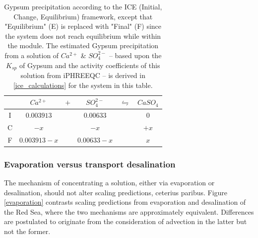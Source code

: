 \begin{supplementary}
\begin{table}[h]
    \centering
    \begin{tabular}{c|ccccc}
      \toprule
       & $Ca^{2+}$ & $+$ & $SO_4^{2-}$ & $\leftrightharpoons$ & $CaSO_4$ \\
      \midrule
      I & $0.003913$ && $0.00633$ && $0$ \\
      C & $-x$ && $-x$ && $+x$ \\
      F & $0.003913-x$ && $0.00633-x$ && $x$ \\
      \bottomrule
    \end{tabular}
    \caption{
        Gypsum precipitation according to the ICE (Initial, Change, Equilibrium) framework, except that "Equilibrium" (E) is replaced with "Final" (F) since the system does not reach equilibrium while within the module. The estimated Gypsum precipitation from a solution of $Ca^{2+}$ \& $SO_4^{2-}$ -- based upon the $K_{sp}$ of Gypsum and the activity coefficients of this solution from iPHREEQC -- is derived in \ref{ice_calculations} for the system in this table. 
        }
    \label{ice_table}
\end{table}

\subsubsection{Evaporation versus transport desalination}

The mechanism of concentrating a solution, either via evaporation or desalination, should not alter scaling predictions, ceterius paribus. Figure \ref{evaporation} contrasts scaling predictions from evaporation and desalination of the Red Sea, where the two mechanisms are approximately equivalent. Differences are postulated to originate from the consideration of advection in the latter but not the former.


\end{supplementary}
